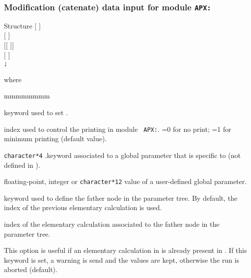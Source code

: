 \subsubsection{Modification (catenate) data input for module {\tt APX:}}\label{sect:descsapx3}

\vskip -0.5cm

\begin{DataStructure}{Structure }
$[$   $]$ \\
$[$   $]$ \\
$[[$   $]]$ \\
$[$  $]$ \\
{\tt ;}
\end{DataStructure}

\noindent where
\begin{ListeDeDescription}{mmmmmmmm}

\item[\moc{EDIT}] keyword used to set .

\item[\dusa{iprint}] index used to control the printing in module {\tt
APX:}. =0 for no print; =1 for minimum printing (default value).

\item[\dusa{parkey}] {\tt character*4} .keyword associated to a
global parameter that is specific to  (not defined in ).

\item[\dusa{value}] floating-point, integer or {\tt character*12} value of a user-defined
global parameter.

\item[\moc{ORIG}] keyword used to define the father node in the parameter tree. By
default, the index of the previous elementary calculation is used.

\item[\dusa{orig}] index of the elementary calculation associated to the father node in the
parameter tree.

\item[\moc{WARNING-ONLY}] This option is useful if an elementary calculation in  
is already present in . If this keyword is set, a warning is send and the  values
are kept, otherwise the run is aborted (default).

\end{ListeDeDescription}

